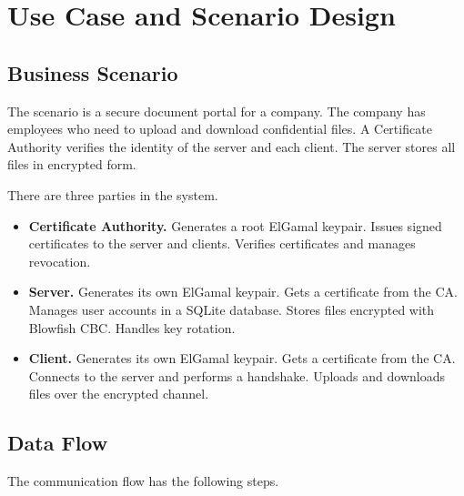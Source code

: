 \documentclass[12pt,a4paper]{article}
\begin{document}

\section{Use Case and Scenario Design}

\subsection{Business Scenario}

The scenario is a secure document portal for a company. The company has employees who need to upload and download confidential files. A Certificate Authority verifies the identity of the server and each client. The server stores all files in encrypted form.

There are three parties in the system.

\begin{itemize}
    \item \textbf{Certificate Authority.} Generates a root ElGamal keypair. Issues signed certificates to the server and clients. Verifies certificates and manages revocation.
    \item \textbf{Server.} Generates its own ElGamal keypair. Gets a certificate from the CA. Manages user accounts in a SQLite database. Stores files encrypted with Blowfish CBC. Handles key rotation.
    \item \textbf{Client.} Generates its own ElGamal keypair. Gets a certificate from the CA. Connects to the server and performs a handshake. Uploads and downloads files over the encrypted channel.
\end{itemize}

\subsection{Data Flow}

The communication flow has the following steps.
\end{document}
